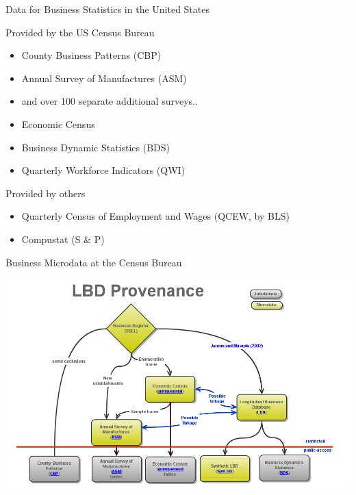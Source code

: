 \begin{frame}{Data for Business Statistics in the United States}
\begin{block}{Provided by the US Census Bureau}
\begin{itemize}
\item County Business Patterns (CBP)
\item Annual Survey of Manufactures (ASM)
\item and over 100 separate additional surveys..
\item Economic Census
\item Business Dynamic Statistics (BDS)
\item Quarterly Workforce Indicators (QWI)
\end{itemize}
\end{block}
\pause
\begin{block}{Provided by others}
\begin{itemize}
\item Quarterly Census of Employment and Wages (QCEW, by BLS)
\item Compustat (S \& P)
\end{itemize}
\end{block}
\end{frame}

\begin{frame}{Business Microdata at the Census Bureau}
\begin{center}
\includegraphics[height=0.8\textheight]{./LBD_Provenance_v2}
\end{center}
\end{frame}

